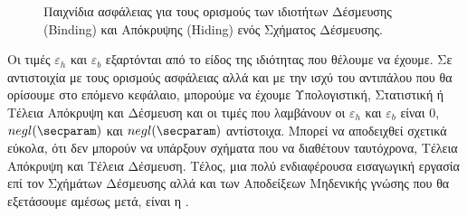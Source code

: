 \begin{figure}[H]
    \centering
{}\qquad
{}
    \caption{Παιχνίδια ασφάλειας για τους ορισμούς των ιδιοτήτων Δέσμευσης (Binding) και Απόκρυψης (Hiding) ενός Σχήματος Δέσμευσης.}
\end{figure}

Οι τιμές $ε_h$ και $ε_b$ εξαρτόνται από το είδος της ιδιότητας που θέλουμε να έχουμε. Σε αντιστοιχία με τους ορισμούς ασφάλειας αλλά και με την ισχύ του αντιπάλου που θα ορίσουμε στο επόμενο κεφάλαιο, μπορούμε να έχουμε Υπολογιστική, Στατιστική ή Τέλεια Απόκρυψη και Δέσμευση και οι τιμές που λαμβάνουν οι $ε_h$ και $ε_b$ είναι $0$, $negl(\secparam)$ και  $negl(\secparam)$ αντίστοιχα. Μπορεί να αποδειχθεί σχετικά εύκολα, ότι δεν μπορούν να υπάρξουν σχήματα που να διαθέτουν ταυτόχρονα, Τέλεια Απόκρυψη και Τέλεια Δέσμευση. Τέλος, μια πολύ ενδιαφέρουσα εισαγωγική εργασία επί τον Σχήμάτων Δέσμευσης αλλά και των Αποδείξεων Μηδενικής γνώσης που θα εξετάσουμε αμέσως μετά, είναι η \cite{damgaard1998commitment}.

